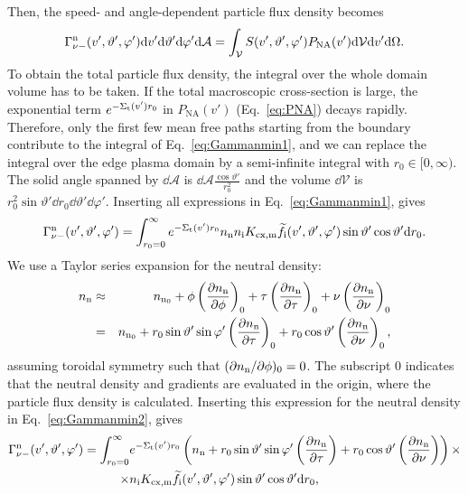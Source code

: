 Then, the speed- and angle-dependent particle flux density becomes
\begin{equation}
\Gamma_{\nu -}^{\mathrm{n}}(v',\vartheta',\varphi') \mathrm{d} v' \mathrm{d} \vartheta' \mathrm{d} \varphi' \mathrm{d} \mathcal{A} = \int_{\mathcal{V}} S(v',\vartheta',\varphi') P_{\mathrm{NA}}(v') \mathrm{d} \mathcal{V} \mathrm{d} v' \mathrm{d} \Omega. \label{eq:Gammanmin1}
\end{equation}
To obtain the total particle flux density, the integral over the whole domain volume has to be taken. If the total macroscopic cross-section is large, the exponential term $e^{-\Sigma_{\mathrm{t}}(v') r_{0}}$ in $P_{\mathrm{NA}}(v')$ (Eq.~\eqref{eq:PNA}) decays rapidly. Therefore, only the first few mean free paths starting from the boundary contribute to the integral of Eq.~\eqref{eq:Gammanmin1}, and we can replace the integral over the edge plasma domain by a semi-infinite integral with $r_{0} \in [0,\infty )$. The solid angle spanned by $\dd \mathcal{A}$ is $\dd \mathcal{A} \frac{\cos\vartheta'}{r_{0}^{2}}$ and the volume $\dd \mathcal{V}$ is $r_{0}^{2}\sin \vartheta' \dd r_{0} \dd \vartheta' \dd \varphi'$. Inserting all expressions in Eq.~\eqref{eq:Gammanmin1}, gives
\begin{equation}
\Gamma_{\nu -}^{\mathrm{n}}(v',\vartheta',\varphi') = \int_{r_{0}=0}^{\infty} e^{-\Sigma_{\mathrm{t}}(v') r_{0}} n_{\mathrm{n}} n_{\mathrm{i}} K_{\mathrm{cx,m}} \widetilde{f}_{\mathrm{i}}(v',\vartheta',\varphi') \sin \vartheta' \cos \vartheta' \mathrm{d} r_{0}. \label{eq:Gammanmin2}
\end{equation}
We use a Taylor series expansion for the neutral density:
\begin{eqnarray}
n_{\mathrm{n}} &\approx& n_{\mathrm{n}_{0}} + \phi \left (\frac{\partial n_{\mathrm{n}}}{\partial \phi}\right )_{0} + \tau \left (\frac{\partial n_{\mathrm{n}}}{\partial \tau}\right )_{0} + \nu \left (\frac{\partial n_{\mathrm{n}}}{\partial \nu} \right )_{0} \nonumber \\
&=& n_{\mathrm{n}_{0}} + r_{0} \sin \vartheta' \sin \varphi' \left (\frac{\partial n_{\mathrm{n}}}{\partial \tau}\right )_{0}  + r_{0} \cos \vartheta' \left (\frac{\partial n_{\mathrm{n}}}{\partial \nu} \right )_{0},
\end{eqnarray}
assuming toroidal symmetry such that $(\partial n_{\mathrm{n}}/\partial \phi)_{0} = 0$. The subscript 0 indicates that the neutral density and gradients are evaluated in the origin, where the particle flux density is calculated. Inserting this expression for the neutral density in Eq.~\eqref{eq:Gammanmin2}, gives
\begin{align}
\Gamma_{\nu -}^{\mathrm{n}}(v',\vartheta',\varphi') = \int_{r_{0}=0}^{\infty} & e^{-\Sigma_{\mathrm{t}}(v') r_{0}} \left( n_{\mathrm{n}} + r_{0} \sin \vartheta' \sin \varphi' \left( \frac{\partial n_{\mathrm{n}}}{\partial \tau} \right) + r_{0} \cos \vartheta' \left( \frac{\partial n_{\mathrm{n}}}{\partial \nu}\right) \right) \times \nonumber \\
\times & n_{\mathrm{i}} K_{\mathrm{cx,m}} \widetilde{f}_{\mathrm{i}}(v',\vartheta',\varphi') \sin \vartheta' \cos \vartheta' \mathrm{d} r_{0}, \label{eq:Gammanmin3}
\end{align}
